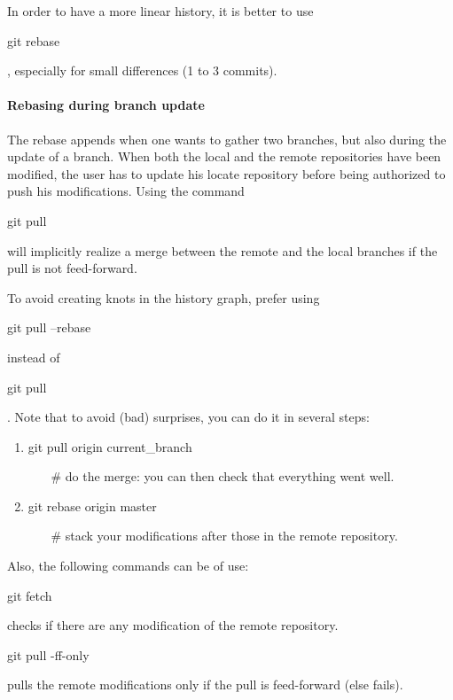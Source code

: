 In order to have a more linear history, it is better to use \begin{tt}git rebase\end{tt}, especially for small differences (1 to 3 commits).\\

\paragraph{Rebasing during branch update}

The rebase appends when one wants to gather two branches, but also during the update of a branch.
When both the local and the remote repositories have been modified, the user has to update his
locate repository before being authorized to push his modifications.
Using the command \begin{tt}git pull\end{tt} will implicitly realize a merge between the remote and the local branches if the pull is not feed-forward.

To avoid creating knots in the history graph, prefer using \begin{tt}git pull --rebase\end{tt} instead of \begin{tt}git pull\end{tt}. 
Note that to avoid (bad) surprises, you can do it in several steps:\\
\begin{enumerate}[noitemsep]
\item \begin{tt}git pull origin current\_branch\end{tt} ~~~
 \# do the merge: you can then check that everything went well.
\item 
\begin{tt}git rebase  origin master\end{tt}  ~~~
 \# stack your modifications after those in the remote repository.
\end{enumerate}
 
Also, the following commands can be of use:
\begin{tt}git fetch \end{tt} checks if there are any modification of the remote repository.\\
\begin{tt}git pull -ff-only \end{tt} pulls the remote modifications only if the pull is feed-forward (else fails).\\

